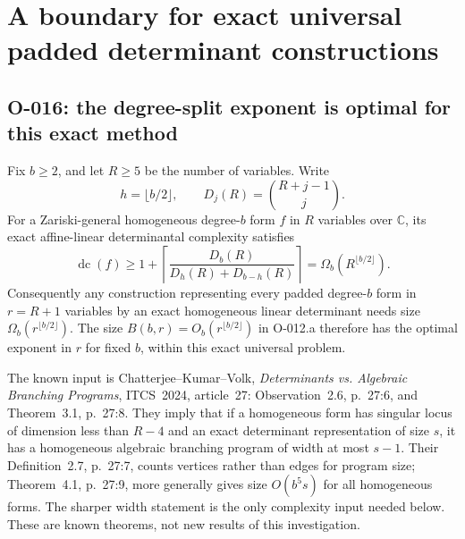 \section{A boundary for exact universal padded determinant constructions}

\subsection{O-016: the degree-split exponent is optimal for this exact method}
Fix $b\geq2$, and let $R\geq5$ be the number of variables.
Write
\[
 h=\lfloor b/2\rfloor,\qquad
 D_j(R)=\binom{R+j-1}{j}.
\]
For a Zariski-general homogeneous degree-$b$ form $f$ in
$R$ variables over $\mathbb C$, its exact affine-linear
determinantal complexity satisfies
\[
 \operatorname{dc}(f)\geq
 1+\left\lceil\frac{D_b(R)}{D_h(R)+D_{b-h}(R)}\right\rceil
                         =\Omega_b(R^{\lfloor b/2\rfloor}).
                                                               \tag{O-016.1}
\]
Consequently any construction representing every padded
degree-$b$ form in $r=R+1$ variables by an exact homogeneous
linear determinant needs size
$\Omega_b(r^{\lfloor b/2\rfloor})$. The size
$B(b,r)=O_b(r^{\lfloor b/2\rfloor})$ in O-012.a therefore
has the optimal exponent in $r$ for fixed $b$, within this
exact universal problem.

The known input is Chatterjee--Kumar--Volk,
\emph{Determinants vs. Algebraic Branching Programs}, ITCS~2024,
article~27: Observation~2.6, p.~27:6, and Theorem~3.1,
p.~27:8. They imply that if a homogeneous form has singular
locus of dimension less than $R-4$ and an exact determinant
representation of size $s$, it has a homogeneous algebraic
branching program of width at most $s-1$. Their Definition~2.7,
p.~27:7, counts vertices rather than edges for program size;
Theorem~4.1, p.~27:9, more generally gives size $O(b^5s)$
for all homogeneous forms. The sharper width statement is
the only complexity input needed below. These are known
theorems, not new results of this investigation.

